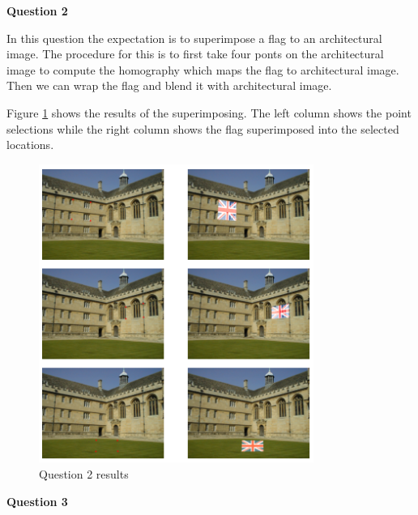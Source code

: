 \documentclass[11pt]{article}
\begin{document}
\noindent \textbf{Question 2}

\noindent In this question the expectation is to superimpose a flag to an architectural image. The procedure for this is to first take four ponts
on the architectural image to compute the homography which maps the flag to architectural image. Then we can wrap the flag and blend it with architectural
image. 

\noindent Figure \ref{Q2} shows the results of the superimposing. The left column shows the point selections while the right column shows
the flag superimposed into the selected locations. \\

\begin{figure}[!h]
    \centering
    \includegraphics[width=0.8\textwidth]{Images/2.png}
    \caption{Question 2 results}
    \label{Q2}
\end{figure}

\newpage
\noindent \textbf{Question 3}
\end{document}

